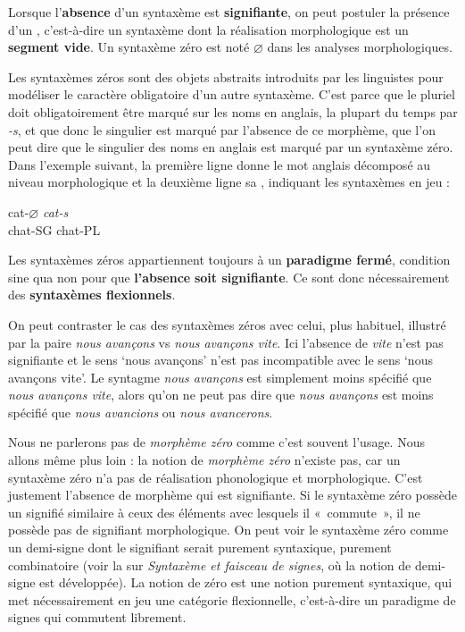\begin{styleLivreImportant}
Lorsque l’\textbf{absence} d’un syntaxème est \textbf{signifiante}, on peut postuler la présence d’un , c’est-à-dire un syntaxème dont la réalisation morphologique est un \textbf{segment vide}. Un syntaxème zéro est noté ${\varnothing}$ dans les analyses morphologiques.
\end{styleLivreImportant}

Les syntaxèmes zéros sont des objets abstraits introduits par les linguistes pour modéliser le caractère obligatoire d’un autre syntaxème. C’est parce que le pluriel doit obligatoirement être marqué sur les noms en anglais, la plupart du temps par \textit{{}-s}, et que donc le singulier est marqué par l’absence de ce morphème, que l’on peut dire que le singulier des noms en anglais est marqué par un syntaxème zéro. Dans l’exemple suivant, la première ligne donne le mot anglais décomposé au niveau morphologique et la deuxième ligne sa , indiquant les syntaxèmes en jeu :

\ea
{cat}{}-${\varnothing}$      \textit{cat-s}\\
chat-SG    chat-PL
\z

Les syntaxèmes zéros appartiennent toujours à un \textbf{paradigme fermé}, condition sine qua non pour que \textbf{l’absence} \textbf{soit signifiante}. Ce sont donc nécessairement des \textbf{syntaxèmes flexionnels}.

On peut contraster le cas des syntaxèmes zéros avec celui, plus habituel, illustré par la paire \textit{nous avançons} vs \textit{nous avançons vite}. Ici l’absence de \textit{vite} n’est pas signifiante et le sens ‘nous avançons’ n’est pas incompatible avec le sens ‘nous avançons vite’. Le syntagme \textit{nous avançons} est simplement moins spécifié que \textit{nous avançons vite}, alors qu’on ne peut pas dire que \textit{nous avançons} est moins spécifié que \textit{nous avancions} ou \textit{nous avancerons}.

Nous ne parlerons pas de \textit{morphème zéro} comme c’est souvent l’usage. Nous allons même plus loin : la notion de \textit{morphème zéro} n’existe pas, car un syntaxème zéro n’a pas de réalisation phonologique et morphologique. C’est justement l’absence de morphème qui est signifiante. Si le syntaxème zéro possède un signifié similaire à ceux des éléments avec lesquels il «~commute~», il ne possède pas de signifiant morphologique. On peut voir le syntaxème zéro comme un demi-signe dont le signifiant serait purement syntaxique, purement combinatoire (voir la  sur \textit{Syntaxème et faisceau de signes}, où la notion de demi-signe est développée). La notion de zéro est une notion purement syntaxique, qui met nécessairement en jeu une catégorie flexionnelle, c’est-à-dire un paradigme de signes qui commutent librement.

